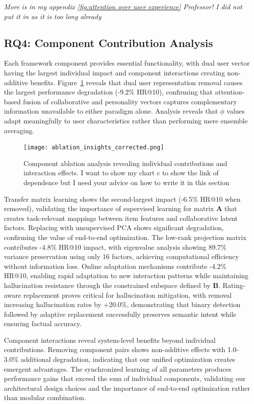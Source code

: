\documentclass[acmsmall]{acmart}
\begin{document}
\textit{More is in my appendix \ref{fig:attention over user experience} Professor! I did not put it in as it is too long already}
\subsection{RQ4: Component Contribution Analysis}

Each framework component provides essential functionality, with dual user vector having the largest individual impact and component interactions creating non-additive benefits. Figure~\ref{fig:rq4_analysis} reveals that dual user representation removal causes the largest performance degradation (-9.2\% HR@10), confirming that attention-based fusion of collaborative and personality vectors captures complementary information unavailable to either paradigm alone. Analysis reveals that $\phi$ values adapt meaningfully to user characteristics rather than performing mere ensemble averaging.

\begin{figure}[h]
\centering
\texttt{[image: ablation\_insights\_corrected.png]}
\caption{Component ablation analysis revealing individual contributions and interaction effects. I want to show my chart c to show the link of dependence but I need your advice on how to write it in this section}
\label{fig:rq4_analysis}
\end{figure}

Transfer matrix learning shows the second-largest impact (-6.5\% HR@10 when removed), validating the importance of supervised learning for matrix $\mathbf{A}$ that creates task-relevant mappings between item features and collaborative latent factors. Replacing with unsupervised PCA shows significant degradation, confirming the value of end-to-end optimization. The low-rank projection matrix contributes -4.8\% HR@10 impact, with eigenvalue analysis showing 89.7\% variance preservation using only 16 factors, achieving computational efficiency without information loss. Online adaptation mechanisms contribute -4.2\% HR@10, enabling rapid adaptation to new interaction patterns while maintaining hallucination resistance through the constrained subspace defined by $\mathbf{B}$. Rating-aware replacement proves critical for hallucination mitigation, with removal increasing hallucination rates by +20.0\%, demonstrating that binary detection followed by adaptive replacement successfully preserves semantic intent while ensuring factual accuracy.

Component interactions reveal system-level benefits beyond individual contributions. Removing component pairs shows non-additive effects with 1.0-3.0\% additional degradation, indicating that our unified optimization creates emergent advantages. The synchronized learning of all parameters produces performance gains that exceed the sum of individual components, validating our architectural design choices and the importance of end-to-end optimization rather than modular combination.
\end{document}
